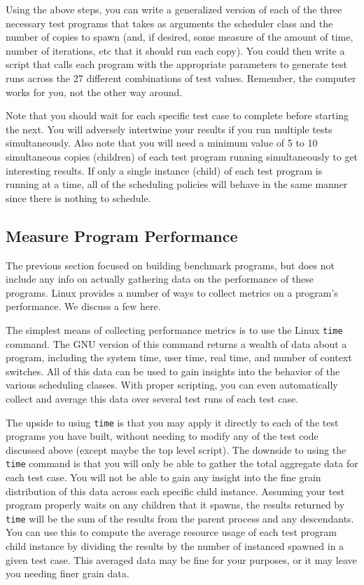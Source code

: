 \documentclass[12pt]{article}
\begin{document}
Using the above steps, you can write a generalized version of each
of the three necessary test programs that takes as arguments the
scheduler class and
the number of copies to spawn (and, if desired, some measure of the
amount of time, number of iterations, etc that it should run each copy).
You could then write a script that calls each program with the
appropriate parameters to generate test runs
across the 27 different combinations of test values. Remember, the
computer works for you, not the other way around.

Note that you
should wait for each specific test case to complete before
starting the next. You will adversely intertwine your results if you
run multiple tests simultaneously. Also note that you will
need a minimum value of 5 to 10 simultaneous copies (children) of each test
program running simultaneously to get interesting results. If only a
single instance (child) of each test program is running at a time, all of the
scheduling policies will behave in the same manner since there is
nothing to schedule.

\subsection{Measure Program Performance}

The previous section focused on building benchmark programs, but does
not include any info on actually gathering data on the performance of
these programs. Linux provides a number of ways to collect metrics on
a program's performance. We discuss a few here.

The simplest means of collecting performance metrics is to use the Linux
\texttt{time} command. The GNU version of this command returns a
wealth of data about a program, including the system time, user time,
real time, and number of context switches. All of this data can be
used to gain insights into the behavior of the various scheduling
classes. With proper scripting, you can even automatically collect and
average this data over several test runs of each test case.

The upside to using \texttt{time} is that you may apply it directly to each of
the test programs you have built, without needing to modify any of the
test code discussed above (except maybe the top level script).
The downside to using the \texttt{time} command is that you will only be able to gather
the total aggregate data for each test case. You will not be able to gain any
insight into the fine grain distribution of this data across each
specific child instance. Assuming your test program properly waits
on any children that it spawns, the results returned by \texttt{time}
will be the sum of the results from the parent process and any
descendants. You can use this to compute the average resource usage of
each test program child instance by dividing the results by the number
of instanced spawned in a given test case.
This averaged data may be fine for your
purposes, or it may leave you needing finer grain data.
\end{document}
